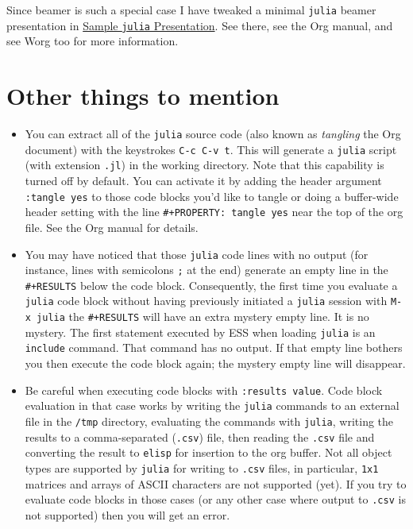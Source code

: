 \documentclass[11pt]{article}
\begin{document}
Since beamer is such a special case I have tweaked a minimal \texttt{julia}
beamer presentation in \href{file://ob-julia-beamer.org}{Sample \texttt{julia} Presentation}. See there, see the
Org manual, and see Worg too for more information.
\section[Other things to mention]{Other things to mention}
\label{sec-5}

\begin{itemize}
\item You can extract all of the \texttt{julia} source code (also known as
\emph{tangling} the Org document) with the keystrokes \texttt{C-c C-v t}.  This
will generate a \texttt{julia} script (with extension \texttt{.jl}) in the working
directory.  Note that this capability is turned off by default.  You
can activate it by adding the header argument \texttt{:tangle yes} to those
code blocks you'd like to tangle or doing a buffer-wide header
setting with the line \texttt{\#+PROPERTY: tangle yes} near the top of the
org file.  See the Org manual for details.

\item You may have noticed that those \texttt{julia} code lines with no output
(for instance, lines with semicolons \texttt{;} at the end) generate an
empty line in the \texttt{\#+RESULTS} below the code block.  Consequently,
the first time you evaluate a \texttt{julia} code block without having
previously initiated a \texttt{julia} session with \texttt{M-x julia} the
\texttt{\#+RESULTS} will have an extra mystery empty line.  It is no
mystery.  The first statement executed by ESS when loading \texttt{julia}
is an \texttt{include} command.  That command has no output.  If that empty
line bothers you then execute the code block again; the mystery
empty line will disappear.

\item Be careful when executing code blocks with \texttt{:results value}.  Code
block evaluation in that case works by writing the \texttt{julia} commands
to an external file in the \texttt{/tmp} directory, evaluating the commands
with \texttt{julia}, writing the results to a comma-separated (\texttt{.csv})
file, then reading the \texttt{.csv} file and converting the result to
\texttt{elisp} for insertion to the org buffer.  Not all object types are
supported by \texttt{julia} for writing to \texttt{.csv} files, in particular,
\texttt{1x1} matrices and arrays of ASCII characters are not supported
(yet).  If you try to evaluate code blocks in those cases (or any
other case where output to \texttt{.csv} is not supported) then you will
get an error.


\end{itemize}
\end{document}
